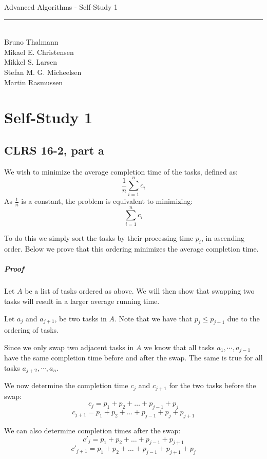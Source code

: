 
\newcommand{\HRule}{\rule{\linewidth}{0.5mm}}


\begin{titlepage}
\centering
{\LARGE Advanced Algorithms - Self-Study 1}
\HRule \\[0.5cm]
Bruno Thalmann\\
			Mikael E. Christensen\\
			Mikkel S. Larsen\\
			Stefan M. G. Micheelsen\\
			Martin Rasmussen
\end{titlepage}

\chapter*{Self-Study 1}

\section*{CLRS 16-2, part a}
We wish to minimize the average completion time of the tasks, defined as:
$$\frac{1}{n}\sum_{i=1}^{n}c_i$$
As $\frac{1}{n}$ is a constant, the problem is equivalent to minimizing:
$$\sum_{i=1}^{n}c_i$$

To do this we simply sort the tasks by their processing time $p_i$, in ascending order.
Below we prove that this ordering minimizes the average completion time.

\paragraph{Proof}
Let $A$ be a list of tasks ordered as above.
We will then show that swapping two tasks will result in a larger average running time.

Let $a_j$ and $a_{j+1}$, be two tasks in $A$.
Note that we have that $p_j \leq p_{j+1}$ due to the ordering of tasks.

Since we only swap two adjacent tasks in $A$ we know that all tasks $a_1, \cdots, a_{j-1}$ have the same completion time before and after the swap.
The same is true for all tasks $a_{j+2},\cdots,a_n$.

We now determine the completion time $c_j$ and $c_{j+1}$ for the two tasks before the swap:
$$c_j=p_1+p_2+\dots+p_{j-1}+p_j$$
$$c_{j+1}=p_1+p_2+\dots+p_{j-1}+p_j + p_{j+1}$$

We can also determine completion times after the swap:
$$c'_j=p_1+p_2+\dots+p_{j-1}+p_{j+1}$$
$$c'_{j+1}=p_1+p_2+\dots+p_{j-1}+p_{j+1} + p_j$$

